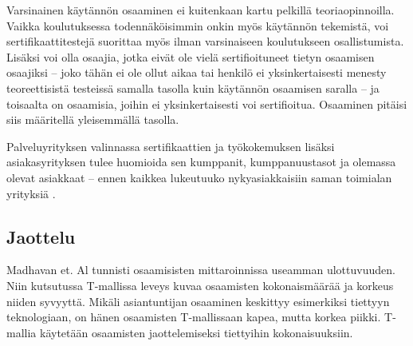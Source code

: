 \documentclass[a4paper,finnish,12pt]{article}
\begin{document}
Varsinainen käytännön osaaminen ei kuitenkaan kartu pelkillä teoriaopinnoilla. Vaikka koulutuksessa todennäköisimmin onkin myös käytännön tekemistä, voi sertifikaattitestejä suorittaa myös ilman varsinaiseen koulutukseen osallistumista. Lisäksi voi olla osaajia, jotka eivät ole vielä sertifioituneet tietyn osaamisen osaajiksi -- joko tähän ei ole ollut aikaa tai henkilö ei yksinkertaisesti menesty teoreettisistä testeissä samalla tasolla kuin käytännön osaamisen saralla -- ja toisaalta on osaamisia, joihin ei yksinkertaisesti voi sertifioitua. Osaaminen pitäisi siis määritellä yleisemmällä tasolla. 

Palveluyrityksen valinnassa sertifikaattien ja työkokemuksen lisäksi asiakasyrityksen tulee huomioida sen kumppanit, kumppanuustasot ja olemassa olevat asiakkaat  -- ennen kaikkea lukeutuuko nykyasiakkaisiin saman toimialan yrityksiä \cite{ICT-haasteet}.

\subsection{Jaottelu}

Madhavan et. Al tunnisti osaamisisten mittaroinnissa useamman ulottuvuuden. Niin kutsutussa T-mallissa leveys kuvaa osaamisten kokonaismäärää ja korkeus niiden syvyyttä. Mikäli asiantuntijan osaaminen keskittyy esimerkiksi tiettyyn teknologiaan, on hänen osaamisten T-mallissaan kapea, mutta korkea piikki. T-mallia käytetään osaamisten jaottelemiseksi tiettyihin kokonaisuuksiin. \cite{ICT-haasteet}
\end{document}
